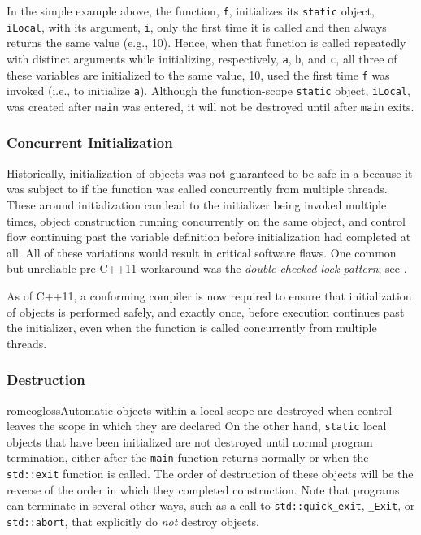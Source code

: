 \noindent In the simple example above, the function, \lstinline!f!, initializes its
\lstinline!static! object, \lstinline!iLocal!, with its argument, \lstinline!i!, only
the first time it is called and then always returns the same value
(e.g., 10). Hence, when that function is called repeatedly with distinct
arguments while initializing, respectively, \lstinline!a!, \lstinline!b!, and
\lstinline!c!, all three of these variables are initialized to the same
value, 10, used the first time \lstinline!f! was invoked (i.e., to
initialize \lstinline!a!). Although the function-scope \lstinline!static!
object, \lstinline!iLocal!, was created after \lstinline!main! was entered, it
will not be destroyed until after \lstinline!main! exits.

\subsubsection[Concurrent Initialization]{Concurrent Initialization}\label{concurrent-initialization}

Historically, initialization of 
 objects was not guaranteed to be safe in a
 because it was subject to 
if the function was called concurrently from multiple threads.   These 
around initialization can lead to the initializer being invoked multiple times, object
construction running concurrently on the same object, and control flow continuing past
the variable definition before initialization had completed at all.  All of these
variations would result in critical software flaws.
One common but unreliable pre-C++11 workaround was the
\emph{double-checked lock pattern}; see .

As of C++11, a conforming compiler is now required to ensure that
initialization of  
objects is performed safely, and exactly once, before execution continues past the initializer, even when the function is called
concurrently from multiple threads. 

\subsubsection[Destruction]{Destruction}\label{destruction}

romeogloss{Automatic} objects within a local scope are destroyed when control
leaves the scope in which they are declared
On the other hand, \lstinline!static! local objects that have been initialized are
not destroyed until normal program termination,  either after the \lstinline!main! function returns
normally or when the \lstinline!std::exit! function is
called. 
The order of destruction
of these objects will be the reverse of the order in which they completed construction.
Note that programs can terminate in several other ways,
such as a call to \lstinline!std::quick_exit!, \lstinline!_Exit!, or
\lstinline!std::abort!, that explicitly do \emph{not} destroy
   objects.


